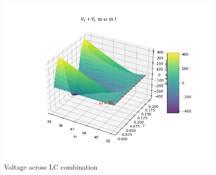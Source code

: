 \documentclass[journal,12pt,twocolumn]{IEEEtran}
\begin{document}
\begin{figure}[h]
     \centering
     \includegraphics[width=\columnwidth]{figs/LCvoltage.png}
     \caption{Voltage across LC combination}
     \label{217.fig.4}
\end{figure}
\end{document}
